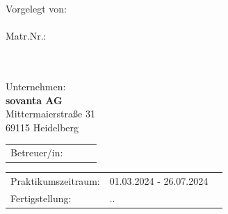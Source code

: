\begin{center}

\vspace{1cm}

\begin{minipage}[t][5cm][s]{\textwidth}%
\centering
\Huge{{\color{TitleHeader}{\fontsize{24}{30} \selectfont \workTitle\\}}}
\vspace{0.5cm}
\LARGE{{\color{TitleHeader}{\fontsize{16}{24} \selectfont \subTitle\\}}}
\end{minipage}

Vorgelegt von:\\ 
\fontsize{15pt}{15pt}\selectfont
\textbf{\studentFirstName\ \studentLastName} \\
\fontsize{11pt}{15pt}\selectfont
Matr.Nr.: \studentId \\
\courseOfStudy
  
\vspace{1.3cm}
    	\fontsize{11pt}{15pt}\selectfont \universityName\\ 
	\faculty \\

\vspace{1.3cm}
    	\fontsize{11pt}{15pt}\selectfont Unternehmen: \\
		\textbf{sovanta AG}\\ 
		Mittermaierstraße 31 \\
		69115 Heidelberg

\vspace{1cm}

\begin{tabular}{lll}
	Betreuer/in: & \advisorPreTitle\ \advisoFirstName\ \advisorLastName \advisorPosTitle\\
\end{tabular}

\vspace{1cm}

\begin{tabular}{lll}
	\fontsize{11pt}{15pt}\selectfont Praktikumszeitraum: & 01.03.2024 - 26.07.2024\\
	Fertigstellung: & \dateDay.\dateMonth.\dateYear
\end{tabular}


\end{center}

\restoregeometry